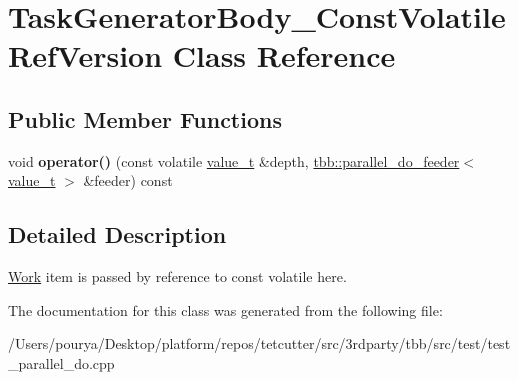 \hypertarget{classTaskGeneratorBody__ConstVolatileRefVersion}{}\section{Task\+Generator\+Body\+\_\+\+Const\+Volatile\+Ref\+Version Class Reference}
\label{classTaskGeneratorBody__ConstVolatileRefVersion}
\subsection*{Public Member Functions}
\begin{DoxyCompactItemize}
\item 
\hypertarget{classTaskGeneratorBody__ConstVolatileRefVersion_a9c8c00fe24aa037c9583ff5b948869e3}{}void {\bfseries operator()} (const volatile \hyperlink{classvalue__t}{value\+\_\+t} \&depth, \hyperlink{classtbb_1_1parallel__do__feeder}{tbb\+::parallel\+\_\+do\+\_\+feeder}$<$ \hyperlink{classvalue__t}{value\+\_\+t} $>$ \&feeder) const \label{classTaskGeneratorBody__ConstVolatileRefVersion_a9c8c00fe24aa037c9583ff5b948869e3}

\end{DoxyCompactItemize}


\subsection{Detailed Description}
\hyperlink{structWork}{Work} item is passed by reference to const volatile here. 

The documentation for this class was generated from the following file\+:\begin{DoxyCompactItemize}
\item 
/\+Users/pourya/\+Desktop/platform/repos/tetcutter/src/3rdparty/tbb/src/test/test\+\_\+parallel\+\_\+do.\+cpp\end{DoxyCompactItemize}
